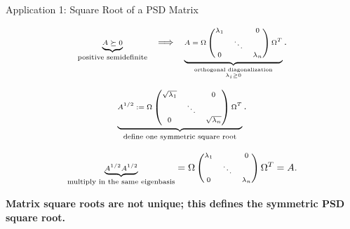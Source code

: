 \documentclass[10pt]{beamer}
\theoremstyle{definition}
\newcommand{\x}[1]{\alert{\textbf{#1}}}
\begin{document}
\begin{frame}[shrink=8]{Application 1: Square Root of a PSD Matrix}

\[
\scriptsize
\underbrace{A\succeq0}_{\text{positive semidefinite}}
\quad\Longrightarrow\quad
\underbrace{
A=
\Omega
\begin{pmatrix}
\lambda_1&&0\\
&\ddots&\\
0&&\lambda_n
\end{pmatrix}
\Omega^T}_{\substack{\text{orthogonal diagonalization}\\\lambda_i\ge0}}.
\]

\vfill

\[
\scriptsize
\underbrace{
A^{1/2}
:=
\Omega
\begin{pmatrix}
\sqrt{\lambda_1}&&0\\
&\ddots&\\
0&&\sqrt{\lambda_n}
\end{pmatrix}
\Omega^T}_{\text{define one symmetric square root}}.
\]

\vfill

\[
\scriptsize
\underbrace{A^{1/2}A^{1/2}}_{\text{multiply in the same eigenbasis}}
=
\Omega
\begin{pmatrix}
\lambda_1&&0\\
&\ddots&\\
0&&\lambda_n
\end{pmatrix}
\Omega^T
=A.
\]

\vfill

\begin{center}
\x{Matrix square roots are not unique; this defines the symmetric PSD square root.}
\end{center}

\end{frame}
\end{document}
